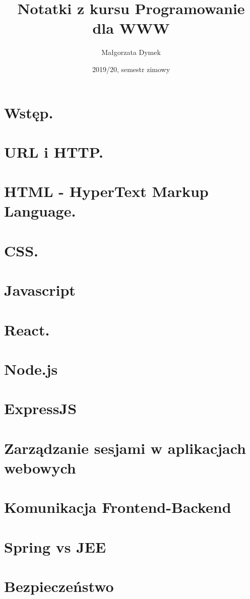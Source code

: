 \documentclass[a4paper]{article}
\title{Notatki z kursu Programowanie dla WWW}
\author{Małgorzata Dymek}
\date{2019/20, semestr zimowy}
\begin{document}
    \maketitle

    \section{Wstęp.}
    

    \section{URL i HTTP.}
    
    

    \section{HTML - HyperText Markup Language.}
    

    \section{CSS.}
    

    \section{Javascript}
    

    \section{React.}
    

    \section{Node.js}
    

    \section{ExpressJS}
    

    \section{Zarządzanie sesjami w aplikacjach webowych}
    

    \section{Komunikacja Frontend-Backend}
    

    \section{Spring vs JEE}
    

    \section{Bezpieczeństwo}
    
\end{document}
